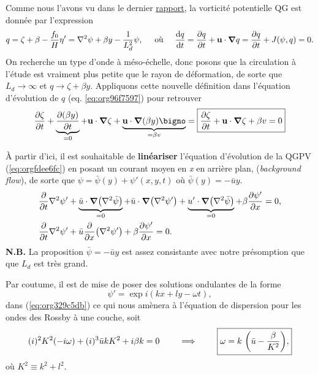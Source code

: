 \documentclass[10pt]{report}
\numberwithin{equation}{section}
\begin{document}
Comme nous l'avons vu dans le dernier \href{rapport-2023-03-24.org}{rapport}, la vorticité potentielle QG est donnée par l'expression
\begin{equation}
\label{eq:org96f7597}
q = \zeta + \beta - \frac{f_0}{H} \eta' = \laplacian \psi + \beta y - \frac{1}{L_d^2} \psi,
\hspace{0.5cm}\text{où}\hspace{0.5cm}
\dv{q}{t} = \pdv{q}{t} + \vb{u} \cdot \gradient q = \pdv{q}{t} + J(\psi,q) =  0.
\end{equation}
On recherche un type d'onde à méso-échelle, donc posons que la circulation à l'étude est vraiment plus petite que le rayon de déformation, de sorte que \(L_d \rightarrow \infty\) et \(q \rightarrow \zeta + \beta y\).
Appliquons cette nouvelle définition dans l'équation d'évolution de \(q\) (eq. \ref{eq:org96f7597}) pour retrouver
\begin{equation}
\label{eq:orgfdee6fc}
\pdv{\zeta}{t} + \underbrace{\pdv{(\beta y)}{t}}_{=0} + \vb{u}\cdot \gradient \zeta + \underbrace{\vb{u} \cdot \gradient(\beta y)\bigno}_{ =\beta v}
= \boxed{
\pdv{\zeta}{t} + \vb{u}\cdot\gradient\zeta  + \beta v = 0
}
\end{equation}

À partir d'ici, il est souhaitable de \textbf{linéariser} l'équation d'évolution de la QGPV (\ref{eq:orgfdee6fc}) en posant un courant moyen  en \emph{x} en arrière plan, (\emph{background flow}), de sorte que \(\psi = \bar{\psi}(y) + \psi'(x,y,t)\) où \(\bar{\psi}(y)=-\bar{u}y\).
\begin{align}
\label{eq:org329c5db}
&\pdv{t} \laplacian \psi' + \underbrace{\bar{u}\cdot \gradient (\laplacian \bar{\psi}) }_{=0}
+ \bar{u}\cdot \gradient (\laplacian \psi')
+ \underbrace{u'\cdot \gradient (\laplacian \bar{\psi}) }_{=0}
+ \beta \pdv{\psi'}{x} = 0,\nonumber \\
%
&\pdv{t} \laplacian \psi' + \bar{u}\pdv{x} (\laplacian \psi') + \beta \pdv{\psi'}{x} = 0.
\end{align}
\textbf{N.B.} La proposition \(\bar{\psi} = -\bar{u} y\) est assez consistante avec notre présomption que que \(L_d\) est très grand. \bigskip

Par coutume, il est de mise de poser des solutions ondulantes de la forme
\begin{equation}
\psi' = \exp{i(kx + ly -\omega t)},
\end{equation}
dans (\ref{eq:org329c5db}) ce qui nous amènera à l'équation de dispersion pour les ondes des Rossby à une couche, soit
\begin{equation}
(i)^2 K^2(-i\omega) + (i)^3\bar{u} k K^2 + i \beta k = 0
\hspace{0.8cm}\Longrightarrow\hspace{0.8cm}
\boxed{\omega = k \ \qty(\bar{u} - \frac{\beta}{K^2}),}
\end{equation}
où \(K^2 \equiv k^2 + l^2\).\bigskip
\end{document}

